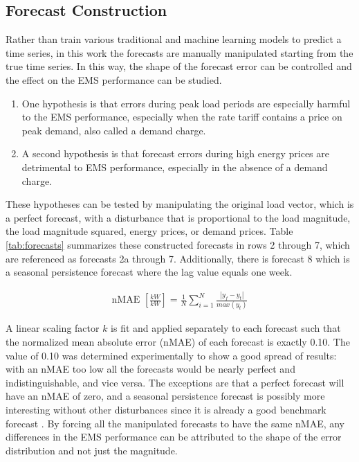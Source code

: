 \documentclass[conference]{IEEEtran}
\begin{document}
\subsection{Forecast Construction}

Rather than train various traditional and machine learning models to predict a time series, in this work the forecasts are manually manipulated starting from the true time series. In this way, the shape of the forecast error can be controlled and the effect on the EMS performance can be studied. 

\begin{enumerate}
\item One hypothesis is that errors during peak load periods are especially harmful to the EMS performance, especially when the rate tariff contains a price on peak demand, also called a demand charge.

\item A second hypothesis is that forecast errors during high energy prices are detrimental to EMS performance, especially in the absence of a demand charge.
\end{enumerate}

These hypotheses can be tested by manipulating the original load vector, which is a perfect forecast, with a disturbance that is proportional to the load magnitude, the load magnitude squared, energy prices, or demand prices. Table \ref{tab:forecasts} summarizes these constructed forecasts in rows 2 through 7, which are referenced as forecasts 2a through 7. Additionally, there is forecast 8 which is a seasonal persistence forecast where the lag value equals one week.

\begin{align}
    \text{nMAE } [\frac{kW}{kW}] = \frac{1}{N} \sum_{i=1}^N \frac{|y_f - y_t|}{max(y_t)} \label{eq:nmae} 
\end{align} 

A linear scaling factor $k$ is fit and applied separately to each forecast such that the normalized mean absolute error (nMAE) of each forecast is exactly 0.10. The value of 0.10 was determined experimentally to show a good spread of results: with an nMAE too low all the forecasts would be nearly perfect and indistinguishable, and vice versa.  The exceptions are that a perfect forecast will have an nMAE of zero, and a seasonal persistence forecast is possibly more interesting without other disturbances since it is already a good benchmark forecast \cite{hyndman2006another}. By forcing all the manipulated forecasts to have the same nMAE, any differences in the EMS performance can be attributed to the shape of the error distribution and not just the magnitude.
\end{document}
